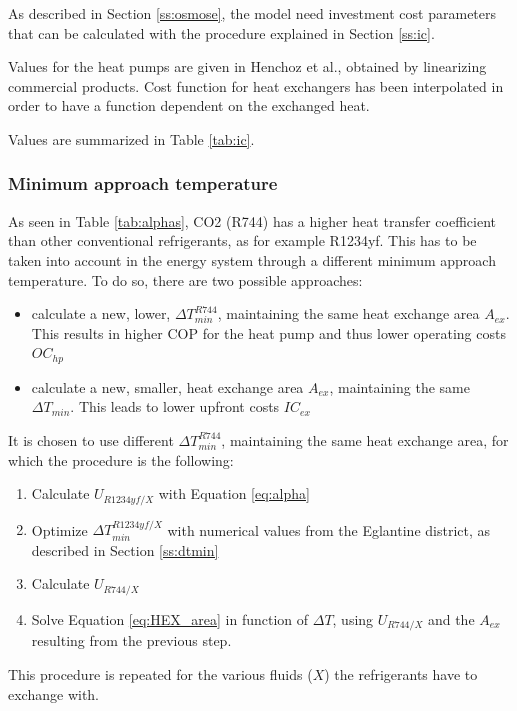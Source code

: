 \documentclass{article}
\begin{document}
As described in Section \ref{ss:osmose}, the model need investment cost parameters that can be calculated with the procedure explained in Section \ref{ss:ic}.

Values for the heat pumps are given in Henchoz et al., obtained by linearizing commercial products\cite{henchozPerformanceProfitabilityPerspectives2015}. Cost function for heat exchangers has been interpolated in order to have a function dependent on the exchanged heat.



Values are summarized in Table \ref{tab:ic}.

\subsubsection{Minimum approach temperature}
As seen in Table \ref{tab:alphas}, CO2 (R744) has a higher heat transfer coefficient than other conventional refrigerants, as for example R1234yf. This has to be taken into account in the energy system through a different minimum approach temperature. To do so, there are two possible approaches:
\begin{itemize}
	\item calculate a new, lower, $\Delta T_{min}^{R744}$, maintaining the same heat exchange area $A_{ex}$. This results in higher COP for the heat pump and thus lower operating costs $OC_{hp}$
	\item calculate a new, smaller, heat exchange area  $A_{ex}$, maintaining the same $\Delta T_{min}$. This leads to lower upfront costs $IC_{ex}$
\end{itemize}

It is chosen to use different $\Delta T_{min}^{R744}$, maintaining the same heat exchange area, for which the procedure is the following:
\begin{enumerate}
	\item Calculate $U_{R1234yf/X}$ with Equation \ref{eq:alpha}
	\item Optimize $\Delta T_{min}^{R1234yf/X}$ with numerical values from the Eglantine district, as described in Section \ref{ss:dtmin}
	\item Calculate  $U_{R744/X}$ 
	\item Solve Equation \ref{eq:HEX_area} in function of $\Delta T$, using $U_{R744/X}$ and the $A_{ex}$ resulting from the previous step.
\end{enumerate}
This procedure is repeated for the various fluids ($X$) the refrigerants have to exchange with.\\
\end{document}
